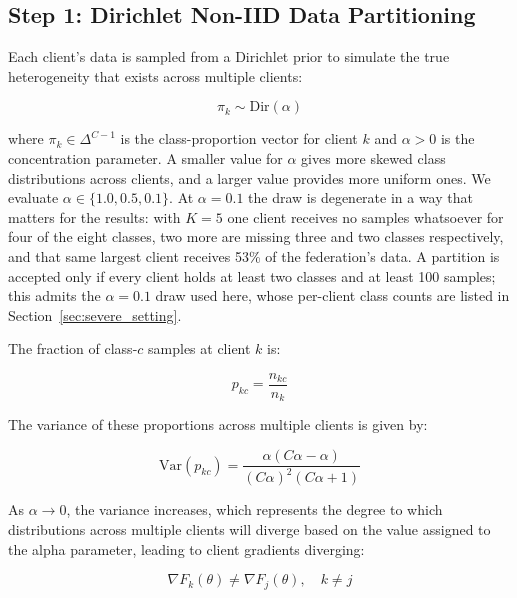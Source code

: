 \documentclass[utf8]{FrontiersinHarvard} %
\begin{document}
\subsection{Step 1: Dirichlet Non-IID Data Partitioning}

Each client's data is sampled from a Dirichlet prior to simulate the true heterogeneity that exists across multiple clients:

\begin{equation}
\label{eq:dirichlet}
\pi_k \sim \text{Dir}(\alpha)
\end{equation}

where $\pi_k \in \Delta^{C-1}$ is the class-proportion vector for client $k$ and $\alpha > 0$ is the concentration parameter. A smaller value for $\alpha$ gives more skewed class distributions across clients, and a larger value provides more uniform ones. We evaluate $\alpha \in \{1.0, 0.5, 0.1\}$. At $\alpha = 0.1$ the draw is degenerate in a way that matters for the results: with $K = 5$ one client receives no samples whatsoever for four of the eight classes, two more are missing three and two classes respectively, and that same largest client receives 53\% of the federation's data. A partition is accepted only if every client holds at least two classes and at least 100 samples; this admits the $\alpha = 0.1$ draw used here, whose per-client class counts are listed in Section~\ref{sec:severe_setting}.

The fraction of class-$c$ samples at client $k$ is:

\begin{equation}
\label{eq:class_proportion}
p_{kc} = \frac{n_{kc}}{n_k}
\end{equation}

The variance of these proportions across multiple clients is given by:

\begin{equation}
\label{eq:dirichlet_variance}
\text{Var}(p_{kc}) =
\frac{\alpha (C\alpha - \alpha)}
{(C\alpha)^2 (C\alpha + 1)}
\end{equation}

As $\alpha \to 0$, the variance increases, which represents the degree to which distributions across multiple clients will diverge based on the value assigned to the alpha parameter, leading to client gradients diverging:

\begin{equation}
\label{eq:gradient_divergence}
\nabla F_k(\theta) \neq \nabla F_j(\theta), \quad k \neq j
\end{equation}
\end{document}
